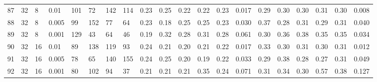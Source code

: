 \begin{landscape}
\begin{longtable}{llllllllllllllllllll}
87 & 32 & 8  & 0.01  & 101 & 72  & 142 & 114 & 0.23 & 0.25 & 0.22 & 0.22 & 0.23 & 0.017 & 0.29 & 0.30 & 0.30 & 0.31 & 0.30 & 0.008 \\
88 & 32 & 8  & 0.005 & 99  & 152 & 77  & 64  & 0.23 & 0.18 & 0.25 & 0.25 & 0.23 & 0.030 & 0.37 & 0.28 & 0.31 & 0.29 & 0.31 & 0.040 \\
89 & 32 & 8  & 0.001 & 129 & 43  & 64  & 46  & 0.19 & 0.32 & 0.28 & 0.31 & 0.28 & 0.061 & 0.30 & 0.36 & 0.38 & 0.35 & 0.35 & 0.034 \\
90 & 32 & 16 & 0.01  & 89  & 138 & 119 & 93  & 0.24 & 0.21 & 0.20 & 0.21 & 0.22 & 0.017 & 0.33 & 0.30 & 0.31 & 0.30 & 0.31 & 0.012 \\
91 & 32 & 16 & 0.005 & 78  & 65  & 140 & 155 & 0.24 & 0.25 & 0.20 & 0.19 & 0.22 & 0.033 & 0.29 & 0.38 & 0.28 & 0.27 & 0.31 & 0.049 \\
92 & 32 & 16 & 0.001 & 80  & 102 & 94  & 37  & 0.21 & 0.21 & 0.21 & 0.35 & 0.24 & 0.071 & 0.31 & 0.34 & 0.30 & 0.57 & 0.38 & 0.127
\end{longtable}
\end{landscape}